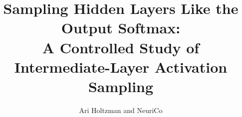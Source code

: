 \documentclass{article}
\title{Sampling Hidden Layers Like the Output Softmax:\\
A Controlled Study of Intermediate-Layer Activation Sampling}
\author{Ari Holtzman and NeuriCo}
\begin{document}
\maketitle

\begin{abstract}

\end{abstract}









\end{document}
